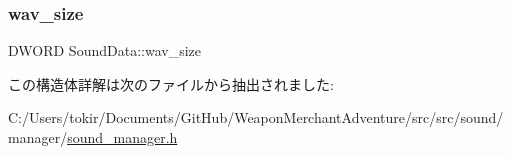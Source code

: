 \subsubsection{\texorpdfstring{wav\+\_\+size}{wav\_size}}
{\footnotesize\ttfamily D\+W\+O\+RD Sound\+Data\+::wav\+\_\+size}



この構造体詳解は次のファイルから抽出されました\+:\begin{DoxyCompactItemize}
\item 
C\+:/\+Users/tokir/\+Documents/\+Git\+Hub/\+Weapon\+Merchant\+Adventure/src/src/sound/manager/\mbox{\hyperlink{sound__manager_8h}{sound\+\_\+manager.\+h}}\end{DoxyCompactItemize}
